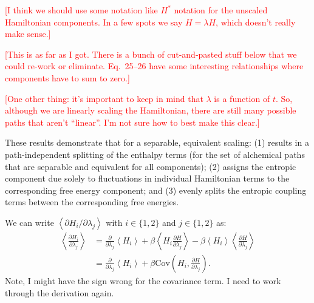 \documentclass[%
 preprint,
 amsmath,amssymb,
 aps,
]{revtex4-1}
\newcommand{\warning}[1]{{\textsf{{\textcolor{red}{{[#1]}{}}}}}}
\begin{document}
\warning{I think we should use some notation like $H^*$ notation for the unscaled Hamiltonian components. In a few spots we say $H = \lambda H$, which doesn't really make sense.}

\warning{This is as far as I got. There is a bunch of cut-and-pasted stuff below that we could re-work or eliminate. Eq.~25--26 have some interesting relationships where components have to sum to zero.}

\warning{One other thing: it's important to keep in mind that $\lambda$ is a function of $t$. So, although we are linearly scaling the Hamiltonian, there are still many possible paths that aren't ``linear''. I'm not sure how to best make this clear.}

These results demonstrate that for a separable, equivalent scaling: (1) results in a path-independent splitting of the enthalpy terms (for the set of alchemical paths that are separable and equivalent for all components); (2) assigns the entropic component due solely to fluctuations in individual Hamiltonian terms to the corresponding free energy component; and (3) evenly splits the entropic coupling terms between the corresponding free energies.

We can write $\left<\partial H_i / \partial \lambda_j\right>$ with $i \in \{1,2\}$ and $j \in \{1,2\}$ as:
\begin{align}
\left<\frac{\partial H_i}{\partial \lambda_j}\right> &=
\frac{\partial}{\partial \lambda_j}\left<H_i\right> +
\beta\left<H_i\frac{\partial H}{\partial \lambda_j}\right>
-\beta\left<H_i\right>\left<\frac{\partial H}{\partial \lambda_j}\right> \\
&= \frac{\partial}{\partial \lambda_j}\left<H_i\right> +
\beta \mathrm{Cov}\left( H_i, \frac{\partial H}{\partial \lambda_j}\right).
\end{align}
Note, I might have the sign wrong for the covariance term. I need to work through the derivation again.
\end{document}
